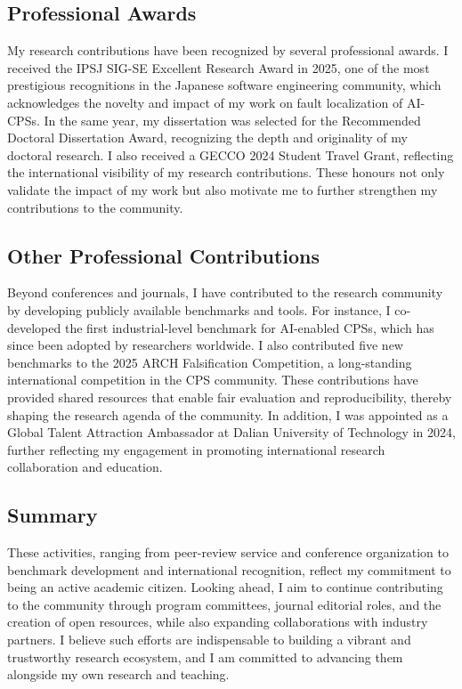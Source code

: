 \documentclass[11pt,a4paper]{moderncv}        %
\begin{document}
\subsection{Professional Awards}
My research contributions have been recognized by several professional awards. I received the IPSJ SIG-SE Excellent Research Award in 2025, one of the most prestigious recognitions in the Japanese software engineering community, which acknowledges the novelty and impact of my work on fault localization of AI-CPSs. In the same year, my dissertation was selected for the Recommended Doctoral Dissertation Award, recognizing the depth and originality of my doctoral research. I also received a GECCO 2024 Student Travel Grant, reflecting the international visibility of my research contributions. These honours not only validate the impact of my work but also motivate me to further strengthen my contributions to the community.

\subsection{Other Professional Contributions}
Beyond conferences and journals, I have contributed to the research community by developing publicly available benchmarks and tools. For instance, I co-developed the first industrial-level benchmark for AI-enabled CPSs, which has since been adopted by researchers worldwide. I also contributed five new benchmarks to the 2025 ARCH Falsification Competition, a long-standing international competition in the CPS community. These contributions have provided shared resources that enable fair evaluation and reproducibility, thereby shaping the research agenda of the community. In addition, I was appointed as a Global Talent Attraction Ambassador at Dalian University of Technology in 2024, further reflecting my engagement in promoting international research collaboration and education.

\subsection{Summary}
These activities, ranging from peer-review service and conference organization to benchmark development and international recognition, reflect my commitment to being an active academic citizen. Looking ahead, I aim to continue contributing to the community through program committees, journal editorial roles, and the creation of open resources, while also expanding collaborations with industry partners. I believe such efforts are indispensable to building a vibrant and trustworthy research ecosystem, and I am committed to advancing them alongside my own research and teaching.
\end{document}
